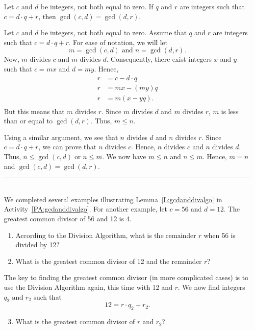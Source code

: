 \begin{lemma}\label{L:gcdanddivalgo}
Let  $c$  and  $d$  be integers, not both equal to zero.  If  $q$  and  $r$  are integers such that  $c = d \cdot q + r$, then  $\gcd( {c, d} ) = \gcd( {d, r} )$.
\end{lemma}
%
\begin{myproof}
Let  $c$  and  $d$  be integers, not both equal to zero.  Assume that  $q$  and  $r$  are integers such that  $c = d \cdot q + r$.  For ease of notation, we will let
\[
m = \gcd( {c, d} )\text{  and  } n = \gcd( {d, r} ).
\]
Now,  $m$  divides  $c$  and  $m$  divides  $d$.  Consequently, there exist integers  $x$  and  $y$  such that  $c = mx$ and  $d = my$.  Hence,
\[
\begin{aligned}
  r &= c - d \cdot q \\ 
  r &= mx - ( {my} )q \\ 
  r &= m ( {x - yq} ). \\ 
\end{aligned} 
\]
But this means that  $m$  divides  $r$.  Since  $m$  divides  $d$  and  $m$ divides  $r$,  $m$  is less than or equal to  $\gcd( {d, r} )$.  Thus,  $m \leq n$.

Using a similar argument, we see that  $n$  divides  $d$  and  $n$  divides $r$.  Since  
$c = d \cdot q + r$, we can prove that  $n$  divides  $c$.  Hence,  $n$  divides  $c$  and  $n$  divides  $d$.  Thus,  $n \leq \gcd( {c, d} )$  or  $n \leq m$.  We now have  $m \leq n$  and  $n \leq m$.  Hence,  $m = n$ and   
$\gcd( {c, d} ) = \gcd( {d, r} )$.
\end{myproof}
\hrule
%
\begin{prog}\label{prog:lemma81} \hfill \\
We completed several examples illustrating Lemma~\ref{L:gcdanddivalgo} in \typeu Activity~\ref*{PA:gcdanddivalgo}.  For another example, let  $c = 56$  and  $d = 12$. The greatest common divisor of 56 and 12 is 4. 

\begin{enumerate}
\item According to the Division Algorithm, what is the remainder $r$ when 56 is divided by 12?
\item What is the greatest common divisor of 12 and the remainder $r$?
\end{enumerate}

The key to finding the greatest common divisor (in more complicated cases) is to use the Division Algorithm again, this time with  12  and  $r$.    We now find integers  
$q_2 \text{ and }r_2 $ such that
\[
  12 = r \cdot q_2  + r_2.
\]
\begin{enumerate} \setcounter{enumi}{2}
\item What is the greatest common divisor of $r$ and $r_2$\!?
\end{enumerate}
\end{prog}
\hbreak

\endinput

